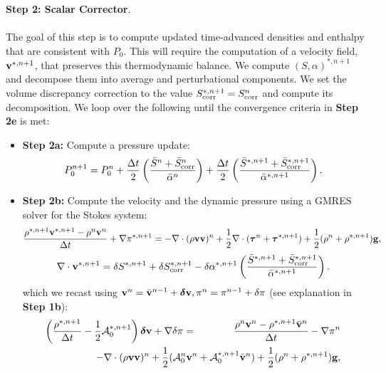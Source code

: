 \documentclass[final]{siamltex}
\def\gb {{\bf g}}
\def\vb {{\bf v}}
\def\deltab {\boldsymbol{\delta}}
\def\taub   {\boldsymbol{\tau}}
\def\half   {\frac{1}{2}}
\begin{document}
{\bf Step 2: Scalar Corrector}.\\ \\
The goal of this step is to compute updated time-advanced densities and enthalpy 
that are consistent with $P_0$.  This will require the computation
of a velocity field, $\vb^{*,n+1}$, that preserves this thermodynamic balance.
We compute $(S,\alpha)^{*,n+1}$ and decompose them
into average and perturbational components.
We set the volume discrepancy correction to the value
$S_{\rm corr}^{*,n+1} = S_{\rm corr}^n$ and compute its decomposition.
We loop over the following until the convergence criteria in {\bf Step 2e} is met:\\
\begin{itemize}
\item {\bf Step 2a:} Compute a pressure update:
\begin{equation}
P_0^{n+1} = P_0^n + \frac{\Delta t}{2}\left(\frac{\bar{S}^n + \bar{S}_{\rm corr}^n}{\bar{\alpha}^n}\right) + \frac{\Delta t}{2}\left(\frac{\bar{S}^{*,n+1} + \bar{S}_{\rm corr}^{*,n+1}}{\bar{\alpha}^{*,n+1}}\right).
\end{equation}
\item {\bf Step 2b:} Compute the velocity and the dynamic pressure using a GMRES solver for the Stokes system:
\begin{equation}
\frac{\rho^{*,n+1}\vb^{*,n+1} - \rho^n\vb^n}{\Delta t} + \nabla\pi^{*,n+1} = -\nabla\cdot(\rho\vb\vb)^n + \frac{1}{2}\nabla\cdot(\taub^n + \taub^{*,n+1}) + \frac{1}{2}(\rho^n + \rho^{*,n+1})\gb,
\end{equation}
\begin{equation}
\nabla\cdot\vb^{*,n+1} = \delta S^{*,n+1} + \delta S_{\rm corr}^{*,n+1} - \delta\alpha^{*,n+1}\left(\frac{\bar{S}^{*,n+1} + \bar{S}_{\rm corr}^{*,n+1}}{\bar{\alpha}^{*,n+1}}\right).
\end{equation}
which we recast using $\vb^n = \bar{\vb}^{n-1} + \deltab\vb, \pi^n = \pi^{n-1} + \delta\pi$ (see explanation in {\bf Step 1b}):
\begin{eqnarray}
\left(\frac{\rho^{*,n+1}}{\Delta t} - \half\mathcal{A}_0^{*,n+1}\right)\deltab\vb + \nabla\delta\pi &=& \frac{\rho^n\vb^n - \rho^{*,n+1}\bar{\vb}^n}{\Delta t} - \nabla\pi^n\nonumber\\
&&\hspace{-1.5in} - \nabla\cdot(\rho\vb\vb)^n + \half(\mathcal{A}_0^n\vb^n+\mathcal{A}_0^{*,n+1}\bar{\vb}^n) + \half(\rho^n + \rho^{*,n+1})\gb,
\end{eqnarray}
\begin{equation}

\end{equation}
\end{itemize}
\end{document}
